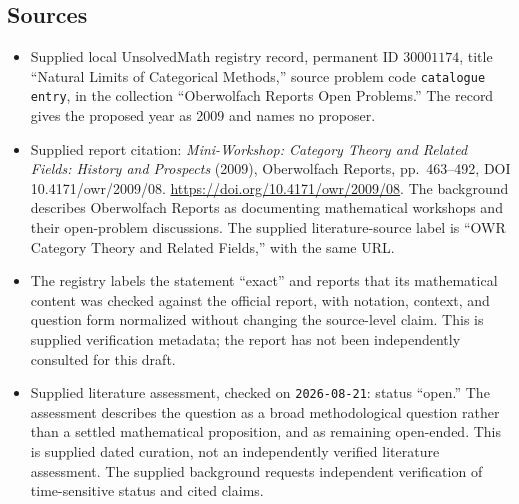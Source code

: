 \documentclass[11pt]{article}
\begin{document}
\subsection{Sources}
\begin{itemize}
\item Supplied local UnsolvedMath registry record, permanent ID \(30001174\), title ``Natural Limits of Categorical Methods,'' source problem code \texttt{catalogue entry}, in the collection ``Oberwolfach Reports Open Problems.'' The record gives the proposed year as 2009 and names no proposer.
\item Supplied report citation: \emph{Mini-Workshop: Category Theory and Related Fields: History and Prospects} (2009), Oberwolfach Reports, pp.~463--492, DOI 10.4171/owr/2009/08. \url{https://doi.org/10.4171/owr/2009/08}. The background describes Oberwolfach Reports as documenting mathematical workshops and their open-problem discussions. The supplied literature-source label is ``OWR Category Theory and Related Fields,'' with the same URL.
\item The registry labels the statement ``exact'' and reports that its mathematical content was checked against the official report, with notation, context, and question form normalized without changing the source-level claim. This is supplied verification metadata; the report has not been independently consulted for this draft.
\item Supplied literature assessment, checked on \texttt{2026-08-21}: status ``open.'' The assessment describes the question as a broad methodological question rather than a settled mathematical proposition, and as remaining open-ended. This is supplied dated curation, not an independently verified literature assessment. The supplied background requests independent verification of time-sensitive status and cited claims.
\end{itemize}
\end{document}
